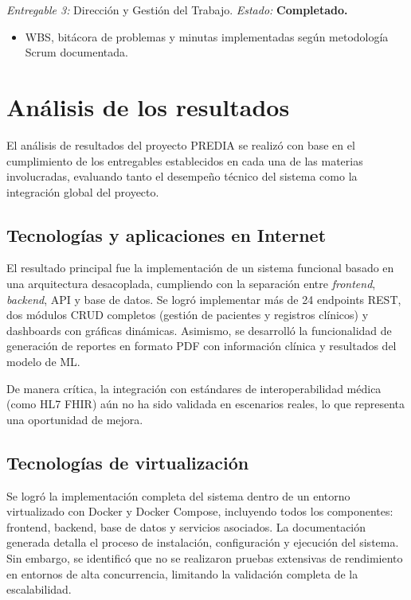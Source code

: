 \documentclass[12pt, letterpaper, twoside]{report}
\begin{document}
\textit{Entregable 3:} Dirección y Gestión del Trabajo. \quad \textit{Estado:} \textbf{Completado.}

\begin{itemize}[leftmargin=1.5cm]
  \item WBS, bitácora de problemas y minutas implementadas según metodología Scrum documentada.
\end{itemize}

\section{Análisis de los resultados}

El análisis de resultados del proyecto PREDIA se realizó con base en el cumplimiento de los entregables establecidos en cada una de las materias involucradas, evaluando tanto el desempeño técnico del sistema como la integración global del proyecto.

\subsection{Tecnologías y aplicaciones en Internet}

El resultado principal fue la implementación de un sistema funcional basado en una arquitectura desacoplada, cumpliendo con la separación entre \textit{frontend}, \textit{backend}, API y base de datos. Se logró implementar más de 24 endpoints REST, dos módulos CRUD completos (gestión de pacientes y registros clínicos) y dashboards con gráficas dinámicas. Asimismo, se desarrolló la funcionalidad de generación de reportes en formato PDF con información clínica y resultados del modelo de ML.

De manera crítica, la integración con estándares de interoperabilidad médica (como HL7 FHIR) aún no ha sido validada en escenarios reales, lo que representa una oportunidad de mejora.

\subsection{Tecnologías de virtualización}

Se logró la implementación completa del sistema dentro de un entorno virtualizado con Docker y Docker Compose, incluyendo todos los componentes: frontend, backend, base de datos y servicios asociados. La documentación generada detalla el proceso de instalación, configuración y ejecución del sistema. Sin embargo, se identificó que no se realizaron pruebas extensivas de rendimiento en entornos de alta concurrencia, limitando la validación completa de la escalabilidad.
\end{document}
